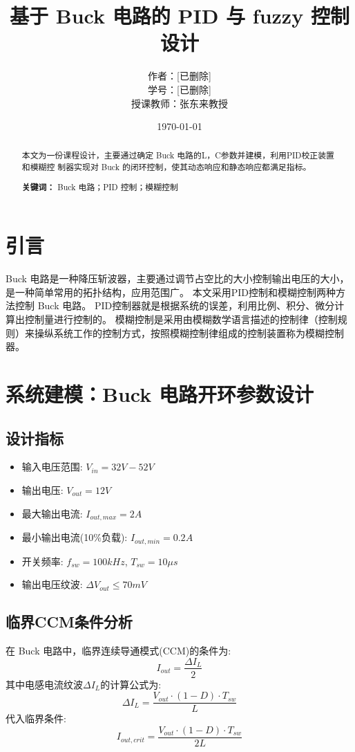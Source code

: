 \documentclass[11pt,a4paper]{ctexart}
\title{基于 Buck 电路的 PID 与 fuzzy 控制设计}
\author{作者：[已删除]\\ 学号：[已删除] \\ 授课教师：张东来教授}
\date{\today}
\begin{document}
\maketitle

\begin{abstract}
本文为一份课程设计，主要通过确定 Buck 电路的L，C参数并建模，利用PID校正装置和模糊控
制器实现对 Buck 的闭环控制，使其动态响应和静态响应都满足指标。\par
\textbf{关键词：} Buck 电路；PID 控制；模糊控制
\end{abstract}
\cleardoublepage
\tableofcontents
\newpage
\section*{引言}
 Buck 电路是一种降压斩波器，主要通过调节占空比的大小控制输出电压的大小，是一种简单常用的拓扑结构，应用范围广。
本文采用PID控制和模糊控制两种方法控制 Buck 电路。
PID控制器就是根据系统的误差，利用比例、积分、微分计算出控制量进行控制的。
模糊控制是采用由模糊数学语言描述的控制律（控制规则）来操纵系统工作的控制方式，按照模糊控制律组成的控制装置称为模糊控制器。

\section{系统建模：Buck 电路开环参数设计}

\subsection{设计指标}
\begin{itemize}
    \item 输入电压范围: $V_{in} = 32V - 52V$
    \item 输出电压: $V_{out} = 12V$
    \item 最大输出电流: $I_{out,max} = 2A$
    \item 最小输出电流(10\%负载): $I_{out,min} = 0.2A$
    \item 开关频率: $f_{sw} = 100kHz$, $T_{sw} = 10\mu s$
    \item 输出电压纹波: $\Delta V_{out} \leq 70mV$
\end{itemize}

\subsection{临界CCM条件分析}

在 Buck 电路中，临界连续导通模式(CCM)的条件为:
\[
I_{out} = \frac{\Delta I_L}{2}
\]
其中电感电流纹波$\Delta I_L$的计算公式为:
\[
\Delta I_L = \frac{V_{out} \cdot (1-D) \cdot T_{sw}}{L}
\]
代入临界条件:
\[
I_{out,crit} = \frac{V_{out} \cdot (1-D) \cdot T_{sw}}{2L}
\]
\end{document}
